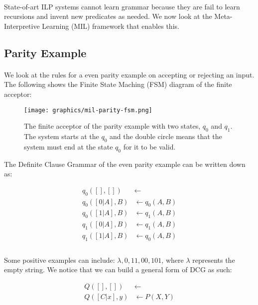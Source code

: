 \documentclass{article}
\theoremstyle{plain}
\theoremstyle{definition}
\begin{document}
\begin{multicols}{2}
\paragraph{} State-of-art ILP systems cannot learn grammar because they are fail to learn recursions and invent new predicates as needed. We now look at the Meta-Interpretive Learning (MIL) framework\cite{muggleton13} that enables this.

\subsection{Parity Example}

\paragraph{} We look at the rules for a even parity example on accepting or rejecting an input. The following shows the Finite State Maching (FSM) diagram of the finite acceptor:

\begin{figure}[H]
\centering
\texttt{[image: graphics/mil-parity-fsm.png]}
\caption{The finite acceptor of the parity example with two states, $q_0$ and $q_1$. The system starts at the $q_0$ and the double circle means that the system must end at the state $q_0$ for it to be valid.}
\end{figure}

The Definite Clause Grammar of the even parity example can be written down as:

\begin{align*}
q_0([], []) &\leftarrow\\
q_0([0|A], B) &\leftarrow q_0(A, B)\\
q_0([1|A], B) &\leftarrow q_1(A, B)\\
q_1([0|A], B) &\leftarrow q_1(A, B)\\
q_1([1|A], B) &\leftarrow q_0(A, B)\\
\end{align*}

\paragraph{} Some positive examples can include: $\lambda, 0, 11, 00, 101$, where $\lambda$ represents the empty string. We notice that we can build a general form of DCG as such:

\begin{align*}
Q([], []) &\leftarrow\\
Q([C|x],y) &\leftarrow P(X, Y)
\end{align*}


\end{multicols}
\end{document}
